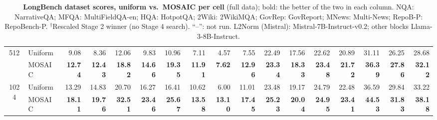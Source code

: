 \begin{table}[tp]
\begin{tabular}{@{} c l rrrr rrrr rrrr rrr @{}}
    \cmidrule(l){1-17}
    \multirow{2}{*}{512} & Uniform & 9.08 & 8.36 & 12.06 & 9.83 & 10.96 & 7.11 & 4.57 & 7.55 & 22.49 & 17.56 & 22.62 & 20.89 & 31.11 & 26.25 & 28.68 \\
     & MOSAIC & \textbf{12.74} & \textbf{12.43} & \textbf{18.82} & \textbf{14.66} & \textbf{19.35} & \textbf{11.91} & \textbf{7.62} & \textbf{12.96} & \textbf{23.34} & \textbf{18.33} & \textbf{23.48} & \textbf{21.72} & \textbf{36.39} & \textbf{27.86} & \textbf{32.12} \\
    \cmidrule(l){1-17}
    \multirow{2}{*}{1024} & Uniform & 13.29 & 14.83 & 20.70 & 16.27 & 16.41 & 10.62 & 6.00 & 11.01 & 23.48 & 19.17 & 24.79 & 22.48 & 36.59 & 29.84 & 33.22 \\
     & MOSAIC & \textbf{18.11} & \textbf{19.76} & \textbf{32.51} & \textbf{23.46} & \textbf{25.67} & \textbf{13.58} & \textbf{13.10} & \textbf{17.45} & \textbf{25.23} & \textbf{20.04} & \textbf{24.95} & \textbf{23.41} & \textbf{44.53} & \textbf{31.83} & \textbf{38.18} \\
    \bottomrule
  \end{tabular}
  \caption{\textbf{LongBench dataset scores, uniform vs.\ MOSAIC per cell} (full data); bold: the better of the two in each column. NQA: NarrativeQA; MFQA: MultiFieldQA-en; HQA: HotpotQA; 2Wiki: 2WikiMQA; GovRep: GovReport; MNews: Multi-News; RepoB-P: RepoBench-P. $^\dagger$Rescaled Stage 2 winner (no Stage 4 search). ``--'': not run. L2Norm (Mistral): Mistral-7B-Instruct-v0.2; other blocks Llama-3-8B-Instruct.}
  \label{tab:app-lb}
\end{table}
